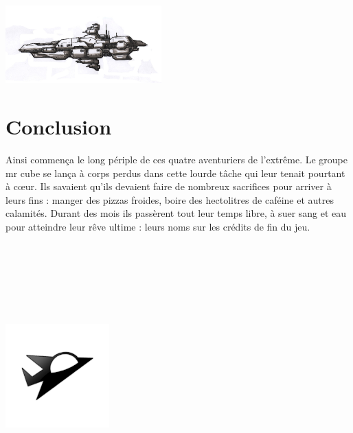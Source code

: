 \documentclass[10pt, titlepage]{report}
\begin{document}
\begin{center}
\centering
\includegraphics[height=3cm, width=6cm]{c.jpg}
\end{center}

\chapter{Conclusion}

Ainsi commença le long périple de ces quatre aventuriers de l'extrême. Le groupe mr cube se lança à corps perdus dans cette lourde tâche qui leur tenait pourtant à c\oe{}ur. Ils savaient qu'ils devaient faire de nombreux sacrifices pour arriver à leurs fins : manger des pizzas froides, boire des hectolitres de caféine et autres calamités. Durant des mois ils passèrent tout leur temps libre, à suer sang et eau pour atteindre leur rêve ultime : leurs noms sur les crédits de fin du jeu.
\\ \\ \\ \\ \\ \\ \\
\begin{center}
\includegraphics[height=4cm, width=4cm]{vaisseux_petit.png}
\end{center}
\end{document}

